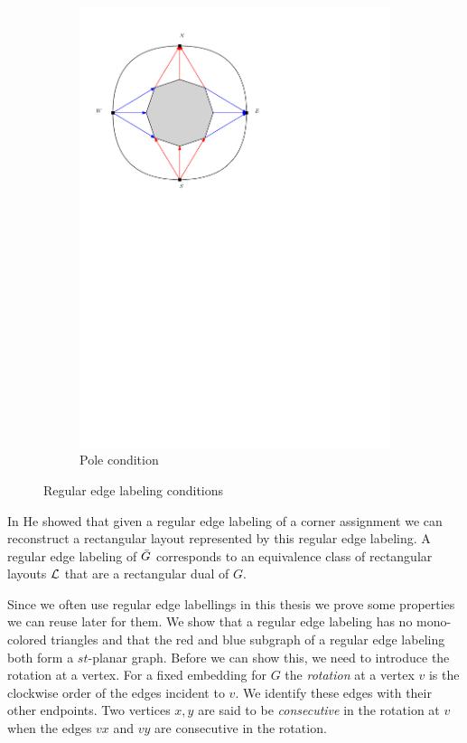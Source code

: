 \begin{figure}
\begin{subfigure}[b]{0.7 \textwidth}
          \includegraphics[width =\textwidth]{rectangularDuals/img/exteriorCondition.pdf}
          \caption{Pole condition}
      \end{subfigure}
      \caption{Regular edge labeling conditions}
  \label{fig:rel:conditions}
  \end{figure}

  In \cite{He1993} He showed that given a regular edge labeling of a corner assignment we can reconstruct a rectangular layout represented by this regular edge labeling.
  A regular edge labeling  of $\bar{G}$ corresponds to an equivalence class of rectangular layouts $\mathcal{L}$ that are a rectangular dual of $G$.

  Since we often use regular edge labellings in this thesis we prove some properties we can reuse later for them. We show that a regular edge labeling has no mono-colored triangles and that the red and blue subgraph of a regular edge labeling both form a $st$-planar graph. Before we can show this, we need to introduce the rotation at a vertex.
  For a fixed embedding for $G$ the \emph{rotation} at a vertex $v$ is the clockwise order of the edges incident to $v$. We identify these edges with their other endpoints.
  Two vertices $x, y$ are said to be \emph{consecutive} in the rotation at $v$ when the edges $vx$ and $vy$ are consecutive in the rotation.

